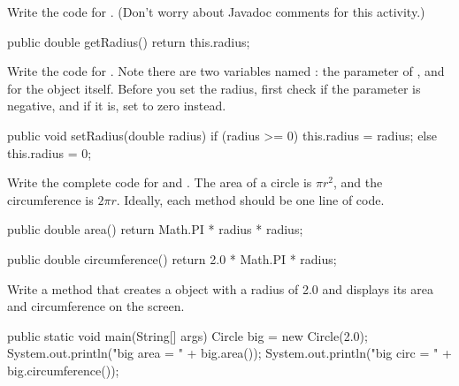 \Q Write the code for . (Don't worry about Javadoc comments for this activity.)

\begin{answer}[6em]
\begin{javaans}
    public double getRadius() {
        return this.radius;
    }
\end{javaans}
\end{answer}


\Q Write the code for . Note there are two variables named : the parameter of , and  for the object itself. Before you set the radius, first check if the parameter is negative, and if it is, set  to zero instead.

\begin{answer}[12em]
\begin{javaans}
    public void setRadius(double radius) {
        if (radius >= 0) {
            this.radius = radius;
        }
        else {
            this.radius = 0;
        }
    }
\end{javaans}
\end{answer}


\Q Write the complete code for  and .
The area of a circle is $\pi r^2$, and the circumference is $2 \pi r$.
Ideally, each method should be one line of code.

\begin{answer}[12em]
\begin{javaans}
    public double area() {
        return Math.PI * radius * radius;
    }

    public double circumference() {
        return 2.0 * Math.PI * radius;
    }
\end{javaans}
\end{answer}


\Q \label{circmain}
Write a  method that creates a  object with a radius of 2.0 and displays its area and circumference on the screen.

\begin{answer}[8em]
\begin{javaans}
    public static void main(String[] args) {
        Circle big = new Circle(2.0);
        System.out.println("big area = " + big.area());
        System.out.println("big circ = " + big.circumference());
    }
\end{javaans}
\end{answer}
